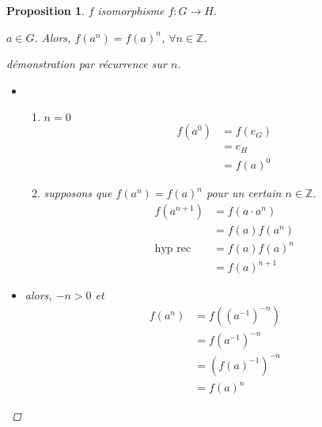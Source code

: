 \documentclass{report}
\newtheorem*{prop}{Proposition}
\theoremstyle{definition}
\theoremstyle{remark}
\begin{document}
	\begin{prop}
		$f$ isomorphisme $f:G \to H$.

		$a \in G$. Alors, $f(a^n)=f(a)^n$, $\forall n \in \mathbb{Z}$.
		\begin{proof}[d\'emonstration par r\'ecurrence sur $n$]~

			\begin{itemize}
				\item[$n\geq 0$]
				\begin{enumerate}
					\item $n=0$
					\begin{align*}
						f(a^0)&= f(e_G)\\
						&= e_H\\
						&= f(a)^0
					\end{align*}
					\item supposons que $f(a^n)=f(a)^n$ pour un certain $n \in \mathbb{Z}$.
					\begin{align*}
						f(a^{n+1})&= f(a \cdot a^n)\\
						&= f(a)f(a^n)\\
						\text{hyp rec}&= f(a)f(a)^n\\
						&= f(a)^{n+1}
					\end{align*}
				\end{enumerate}
				\item[$n<0$] alors, $-n>0$ et
				\begin{align*}
					f(a^n)&= f((a^{-1})^{-n})\\
					&= f(a^{-1})^{-n}\\
					&= (f(a)^{-1})^{-n}\\
					&= f(a)^n
				\end{align*}
			\end{itemize}
		\end{proof}
	\end{prop}
\end{document}
